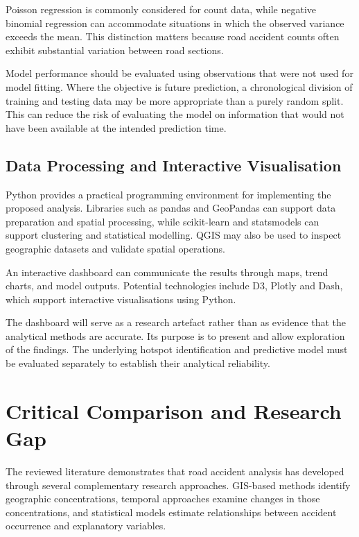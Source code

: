 Poisson regression is commonly considered for count data, while negative binomial regression can accommodate situations in which the observed variance exceeds the mean. This distinction matters because road accident counts often exhibit substantial variation between road sections.

Model performance should be evaluated using observations that were not used for model fitting. Where the objective is future prediction, a chronological division of training and testing data may be more appropriate than a purely random split. This can reduce the risk of evaluating the model on information that would not have been available at the intended prediction time.

\subsection{Data Processing and Interactive Visualisation}
\label{subsec:lit-dataProcessingAndVisualisation}
Python provides a practical programming environment for implementing the proposed analysis. Libraries such as pandas and GeoPandas can support data preparation and spatial processing, while scikit-learn and statsmodels can support clustering and statistical modelling. QGIS may also be used to inspect geographic datasets and validate spatial operations.

An interactive dashboard can communicate the results through maps, trend charts, and model outputs. Potential technologies include D3, Plotly and Dash, which support interactive visualisations using Python.

The dashboard will serve as a research artefact rather than as evidence that the analytical methods are accurate. Its purpose is to present and allow exploration of the findings. The underlying hotspot identification and predictive model must be evaluated separately to establish their analytical reliability.

\section{Critical Comparison and Research Gap}
\label{sec:lit-gap}
%
The reviewed literature demonstrates that road accident analysis has developed through several complementary research approaches. GIS-based methods identify geographic concentrations, temporal approaches examine changes in those concentrations, and statistical models estimate relationships between accident occurrence and explanatory variables.

